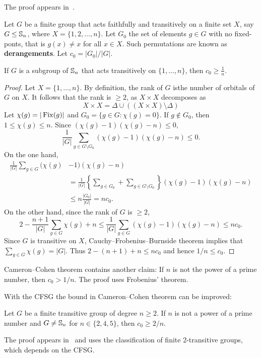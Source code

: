 The proof appears in~\cite{MR636194}. 


Let $G$ be a finite group that acts faithfully and transitively 
on a finite set $X$, say 
$G\leq\mathbb{S}_n$, where $X=\{1,2,\dots,n\}$. Let 
$G_0$ the set of elements $g\in G$ with no fixed-ponts, 
that is $g(x)\ne x$ for all $x\in X$. 
Such permutations are known as \textbf{derangements}. 
Let $c_0=|G_0|/|G|$. 

\begin{theorem}
    If $G$ is a subgroup of $\mathbb{S}_n$ that acts transitively on 
    $\{1,\dots,n\}$, then $c_0\geq\frac{1}{n}$.
\end{theorem}

\begin{proof}
    Let $X=\{1,\dots,n\}$. By definition, the rank of $G$ isthe number
    of orbitals of $G$ on $X$. It follows that the rank is $\geq2$, as
    $X\times X$ decomposes as 
    \[
    X\times X=\Delta\cup\left((X\times X)\setminus\Delta\right)
    \]
    Let $\chi(g)=|\operatorname{Fix}(g)|$ and $G_0=\{g\in G:\chi(g)=0\}$. If $g\not\in G_0$, then $1\leq\chi(g)\leq n$. Since  
    $(\chi(g)-1)(\chi(g)-n)\leq 0$,
    \[
    \frac{1}{|G|}\sum_{g\in G\setminus G_0}(\chi(g)-1)(\chi(g)-n)\leq 0.
    \]
    On the one hand, 
    \begin{align*}
    \frac{1}{|G|}\sum_{g\in G}(\chi(g)&-1)(\chi(g)-n)\\
    &=\frac{1}{|G|}\left\{\sum_{g\in G_0}+\sum_{g\in G\setminus G_0}\right\}(\chi(g)-1)(\chi(g)-n)\\
    &\leq n\frac{|G_0|}{|G|}=nc_0.
    \end{align*}
    On the other hand, since the rank of $G$ is $\geq2$, 
    \begin{equation}
        \label{eq:CameronCohen}
        2-\frac{n+1}{|G|}\sum_{g\in G}\chi(g)+n\leq 
        \frac{1}{|G|}\sum_{g\in G}(\chi(g)-1)(\chi(g)-n)\leq nc_0.
    \end{equation}
    Since $G$ is transitive on $X$, Cauchy--Frobenius--Burnside theorem implies that
    $\sum_{g\in G}\chi(g)=|G|$. Thus $2-(n+1)+n\leq nc_0$ and hence
    $1/n\leq c_0$. 
\end{proof}

Cameron--Cohen theorem contains another claim: If
$n$ is not the power of a prime number, then 
$c_0>1/n$. The proof uses Frobenius' theorem. 

With the CFSG the bound in 
Cameron--Cohen theorem can be improved:

\begin{theorem}
    Let $G$ be a finite transitive group of degree $n\geq2$. If $n$ 
    is not a power of a prime number and 
    $G\ne\mathbb{S}_n$ for $n\in\{2,4,5\}$, then $c_0\geq 2/n$.
\end{theorem}

The proof appears in~\cite{MR1484879} and uses
the classification of finite 2-transitive groups, 
which depends on the CFSG. 



